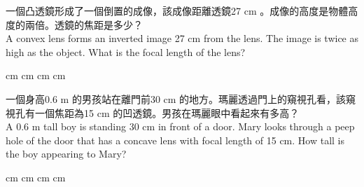 \documentclass[beamer=true]{standalone}
\begin{document}
\begin{eg}
    一個凸透鏡形成了一個倒置的成像，該成像距離透鏡27 cm 。成像的高度是物體高度的兩倍。透鏡的焦距是多少？\\A convex lens forms an inverted image 27 cm from the lens. The image is twice as high as the object. What is the focal length of the lens?
    \begin{tasks}
         cm
         cm
         cm
         cm
    \end{tasks}
\end{eg}

\begin{eg}
    一個身高0.6 m 的男孩站在離門前30 cm 的地方。瑪麗透過門上的窺視孔看，該窺視孔有一個焦距為15 cm 的凹透鏡。男孩在瑪麗眼中看起來有多高？\\
    A 0.6 m tall boy is standing 30 cm in front of a door. Mary looks through a peep hole of the door that has a concave lens with focal length of 15 cm. How tall is the boy appearing to Mary?
    \begin{tasks}
         cm
         cm
         cm
         cm
    \end{tasks}
\end{eg}
\end{document}
